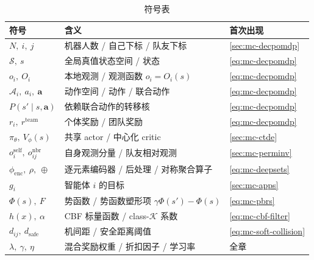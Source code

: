 \begin{table}[H]\centering\small
\caption{符号表}
\label{tab:mc-symbols}
\begin{tabular}{lll}
\toprule
符号 & 含义 & 首次出现 \\
\midrule
$N,\ i,\ j$ & 机器人数 / 自己下标 / 队友下标 & \cref{sec:mc-decpomdp} \\
$\mathcal{S},\ s$ & 全局真值状态空间 / 状态 & \cref{eq:mc-decpomdp} \\
$o_i,\ O_i$ & 本地观测 / 观测函数 $o_i=O_i(s)$ & \cref{eq:mc-decpomdp} \\
$\mathcal{A}_i,\ a_i,\ \mathbf{a}$ & 动作空间 / 动作 / 联合动作 & \cref{eq:mc-decpomdp} \\
$P(s'\mid s,\mathbf{a})$ & 依赖联合动作的转移核 & \cref{eq:mc-decpomdp} \\
$r_i,\ r^{\text{team}}$ & 个体奖励 / 团队奖励 & \cref{eq:mc-decpomdp} \\
$\pi_\theta,\ V_\phi(s)$ & 共享 actor / 中心化 critic & \cref{sec:mc-ctde} \\
$o_i^{\text{self}},\ o_{ij}^{\text{nbr}}$ & 自身观测分量 / 队友相对观测 & \cref{sec:mc-perminv} \\
$\phi_{\mathrm{enc}},\ \rho,\ \oplus$ & 逐元素编码器 / 后处理 / 对称聚合算子 & \cref{eq:mc-deepsets} \\
$g_i$ & 智能体 $i$ 的目标 & \cref{sec:mc-apps} \\
$\Phi(s),\ F$ & 势函数 / 势函数塑形项 $\gamma\Phi(s')-\Phi(s)$ & \cref{eq:mc-pbrs} \\
$h(x),\ \alpha$ & CBF 标量函数 / class-$\mathcal{K}$ 系数 & \cref{eq:mc-cbf-filter} \\
$d_{ij},\ d_{\text{safe}}$ & 机间距 / 安全距离阈值 & \cref{eq:mc-soft-collision} \\
$\lambda,\ \gamma,\ \eta$ & 混合奖励权重 / 折扣因子 / 学习率 & 全章 \\
\bottomrule
\end{tabular}
\end{table}

